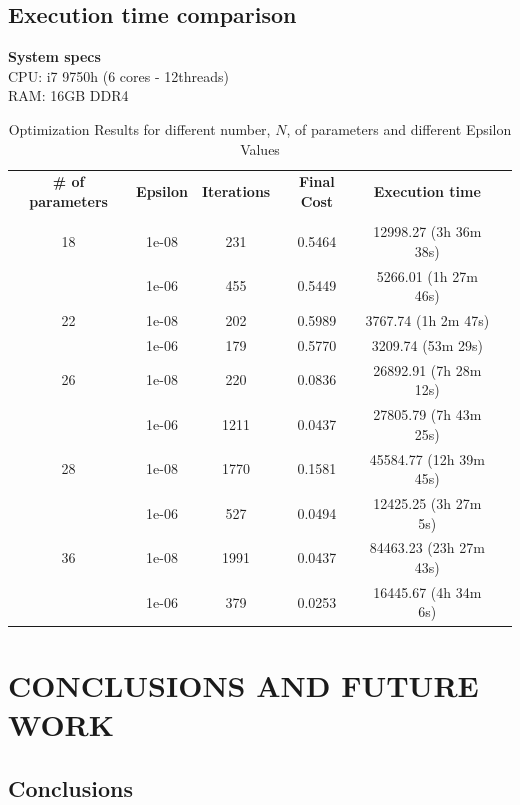 \documentclass[inscr,ack,preface]{diphdthesis}
\begin{document}
\section{Execution time comparison}

\textbf{System specs} \\
CPU: i7 9750h (6 cores - 12threads)\\
RAM: 16GB DDR4\\

\begin{table}[htbp]
  \centering
  \caption{Optimization Results for different number, $N$, of parameters and different Epsilon Values}
  \label{tab:results}
  \begin{tabular}{cccccc}
    \toprule
    \textbf{\# of parameters} & \textbf{Epsilon} & \textbf{Iterations} & \textbf{Final Cost} & \textbf{Execution time} \\
    & & & \\
    \midrule
    18 & 1e-08   & 231 & 0.5464 & 12998.27 (3h 36m 38s) \\
       & 1e-06   & 455 & 0.5449 & 5266.01 (1h 27m 46s) \\
    \midrule
    22 & 1e-08   & 202 & 0.5989 & 3767.74 (1h 2m 47s) \\
       & 1e-06   & 179 & 0.5770 & 3209.74 (53m 29s) \\
    \midrule
    26 & 1e-08   & 220  & 0.0836 & 26892.91 (7h 28m 12s) \\
       & 1e-06   & 1211 & 0.0437 & 27805.79 (7h 43m 25s) \\
    \midrule
    28 & 1e-08   & 1770 & 0.1581 & 45584.77 (12h 39m 45s) \\
       & 1e-06   & 527  & 0.0494 & 12425.25 (3h 27m 5s) \\
    \midrule
    36 & 1e-08   & 1991 & 0.0437 & 84463.23 (23h 27m 43s) \\
       & 1e-06   & 379  & 0.0253 & 16445.67 (4h 34m 6s) \\
    \bottomrule
  \end{tabular}
\end{table}


\chapter{CONCLUSIONS AND FUTURE WORK}

\section{Conclusions}
\end{document}
